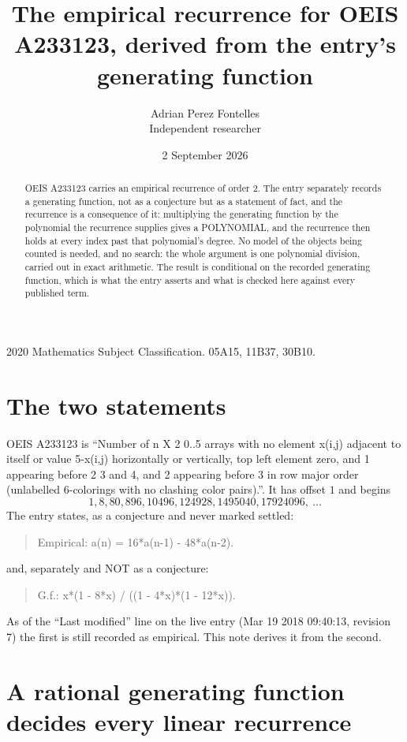 \documentclass[11pt,a4paper]{article}
\title{The empirical recurrence for OEIS A233123, derived from the entry's generating function}
\author{Adrian Perez Fontelles\\ \small Independent researcher}
\date{2 September 2026}
\theoremstyle{plain}
\theoremstyle{definition}
\begin{document}
\maketitle

\begin{abstract}
OEIS A233123 carries an empirical recurrence of order $2$. The entry separately records a
generating function, not as a conjecture but as a statement of fact, and the recurrence is a
consequence of it: multiplying the generating function by the polynomial the recurrence
supplies gives a POLYNOMIAL, and the recurrence then holds at every index past that
polynomial's degree. No model of the objects being counted is needed, and no search: the
whole argument is one polynomial division, carried out in exact arithmetic. The result is
conditional on the recorded generating function, which is what the entry asserts and what is
checked here against every published term.
\end{abstract}

\noindent\small 2020 Mathematics Subject Classification. 05A15, 11B37, 30B10.\normalsize

\section{The two statements}

OEIS A233123 is ``Number of n X 2 0..5 arrays with no element x(i,j) adjacent to itself or value 5-x(i,j) horizontally or vertically, top left element zero, and 1 appearing before 2 3 and 4, and 2 appearing before 3 in row major order (unlabelled 6-colorings with no clashing color pairs).''. It has offset $1$ and begins
\[
1, 8, 80, 896, 10496, 124928, 1495040, 17924096,\ \dots
\]
The entry states, as a conjecture and never marked settled:
\begin{quote}
Empirical: a(n) = 16*a(n-1) - 48*a(n-2).
\end{quote}
and, separately and NOT as a conjecture:
\begin{quote}
G.f.: x*(1 - 8*x) / ((1 - 4*x)*(1 - 12*x)).
\end{quote}
As of the ``Last modified'' line on the live entry (Mar 19 2018 09:40:13, revision 7) the first is still
recorded as empirical. This note derives it from the second.

\section{A rational generating function decides every linear recurrence}
\end{document}
